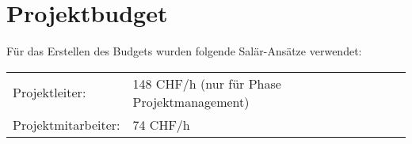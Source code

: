 \renewcommand{\arraystretch}{1.2}
\section{Projektbudget}
Für das Erstellen des Budgets wurden folgende Salär-Ansätze verwendet: 
\begin{table}[H]
\begin{tabular}{ll}
Projektleiter:      & 148 CHF/h (nur für Phase Projektmanagement) \\
Projektmitarbeiter: & 74 CHF/h                                   
\end{tabular}
\end{table}

